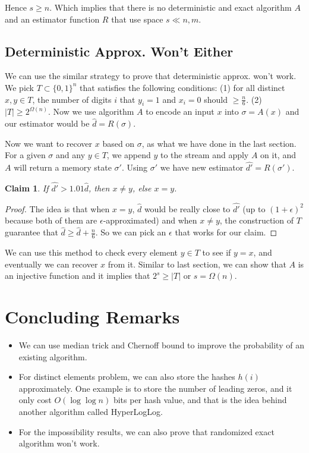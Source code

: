 \documentclass[11pt]{article}
\newtheorem{claim}[theorem]{Claim}
\begin{document}
Hence $s \ge n$. Which implies that there is no deterministic and exact algorithm $A$ and an estimator function $R$ that use space $s \ll n, m$.

\subsection{Deterministic Approx. Won't Either}

We can use the similar strategy to prove that deterministic approx. won't work. We pick $T \subset \{0, 1\}^{n}$ that satisfies the following conditions: (1) for all distinct $x, y \in T$, the number of digits $i$ that $y_i=1$ and $x_i=0$ should $\ge \frac{n}{6}$. (2) $|T| \ge 2^{\Omega(n)}$. Now we use algorithm $A$ to encode an input $x$ into $\sigma=A(x)$ and our estimator would be $\hat{d}=R(\sigma)$.

Now we want to recover $x$ based on $\sigma$, as what we have done in the last section. For a given $\sigma$ and any $y \in T$, we append $y$ to the stream and apply $A$ on it, and $A$ will return a memory state $\sigma'$. Using $\sigma'$ we have new estimator $\hat{d'}=R(\sigma')$.

\begin{claim}
If $\hat{d'} > 1.01 \hat{d}$, then $x \ne y$, else $x=y$.
\end{claim}

\begin{proof}
The idea is that when $x=y$, $\hat{d}$ would be really close to $\hat{d'}$ (up to $(1+\epsilon)^{2}$ because both of them are $\epsilon$-approximated) and when $x \ne y$, the construction of $T$ guarantee that $\hat{d} \ge \hat{d} + \frac{n}{6}$. So we can pick an $\epsilon$ that works for our claim.
\end{proof}

We can use this method to check every element $y \in T$ to see if $y=x$, and eventually we can recover $x$ from it. Similar to last section, we can show that $A$ is an injective function and it implies that $2^{s} \ge |T|$ or $s = \Omega(n)$.

\section{Concluding Remarks}

\begin{itemize}

\item We can use median trick and Chernoff bound to improve the probability of an existing algorithm.

\item For distinct elements problem, we can also store the hashes $h(i)$ approximately. One example is to store the number of leading zeros, and it only cost $O(\log \log n)$ bits per hash value, and that is the idea behind another algorithm called HyperLogLog.

\item For the impossibility results, we can also prove that randomized exact algorithm won't work.
\end{itemize}
\end{document}
